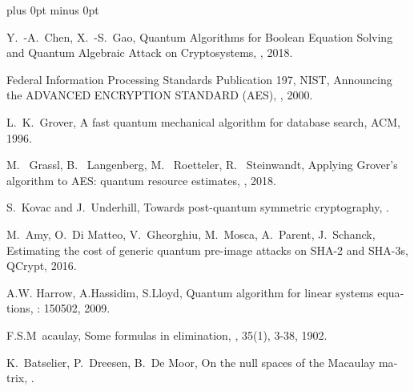 \documentclass[a4paper,11pt]{article}
\begin{document}
\begin{otherlanguage}{english}
\vspace{0.3cm} 






\begin{thebibliography}{1}
\itemsep=0cm plus 0pt minus 0pt

Y.~-A.~Chen, X.~-S.~Gao,
  \newblock Quantum Algorithms for Boolean Equation Solving and Quantum Algebraic Attack on Cryptosystems,
  , 2018.

Federal Information Processing Standards Publication 197, NIST,
  \newblock Announcing the ADVANCED ENCRYPTION STANDARD (AES),
  , 2000.

L.~K.~Grover,
  \newblock A fast quantum mechanical algorithm for database search, 
   ACM, 1996.

M.~ Grassl, B.~ Langenberg, M.~ Roetteler, R.~ Steinwandt,
  \newblock Applying Grover’s algorithm to AES: quantum resource estimates,
  , 2018.

S.~Kovac and J.~Underhill,
  \newblock Towards post-quantum symmetric cryptography,
  .

M.~Amy, O.~Di Matteo, V.~Gheorghiu, M.~Mosca, A.~Parent, J.~Schanck,
  \newblock Estimating the cost of generic quantum pre-image attacks on SHA-2 and SHA-3s, 
   QCrypt, 2016.

A.W. Harrow, A.Hassidim, S.Lloyd, 
  \newblock Quantum algorithm for linear systems equations, 
  : 150502, 2009. 

F.S.M~acaulay, 
  \newblock Some formulas in elimination, 
  , 35(1), 3-38, 1902. 

K.~Batselier, P.~Dreesen, B.~De Moor, 
  \newblock On the null spaces of the Macaulay matrix, 
  .  



\end{thebibliography}
\end{otherlanguage}
\end{document}
